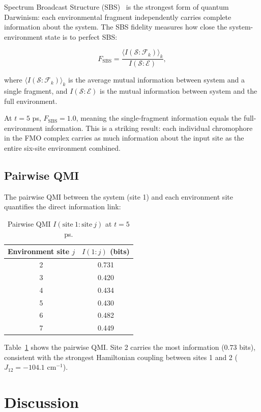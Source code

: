 \documentclass[aps,njp,twocolumn,showpacs,superscriptaddress]{revtex4-2}
\begin{document}
Spectrum Broadcast Structure (SBS)~\cite{Horodecki2015} is the strongest form of quantum Darwinism: each environmental fragment independently carries complete information about the system. The SBS fidelity measures how close the system-environment state is to perfect SBS:

\[
F_{\mathrm{SBS}} = \frac{\langle I(\mathcal{S} : \mathcal{F}_k) \rangle_k}{I(\mathcal{S} : \mathcal{E})},
\]

where $\langle I(\mathcal{S} : \mathcal{F}_k) \rangle_k$ is the average mutual information between system and a single fragment, and $I(\mathcal{S} : \mathcal{E})$ is the mutual information between system and the full environment.

At $t = 5$ ps, $F_{\mathrm{SBS}} = 1.0$, meaning the single-fragment information equals the full-environment information. This is a striking result: each individual chromophore in the FMO complex carries as much information about the input site as the entire six-site environment combined.

\subsection{Pairwise QMI}

The pairwise QMI between the system (site 1) and each environment site quantifies the direct information link:

\begin{table}[htbp]
\caption{Pairwise QMI $I(\mathrm{site\ 1} : \mathrm{site}\ j)$ at $t = 5$ ps.}
\label{tab:qmi}
\centering
\begin{tabular}{cc}
\toprule
Environment site $j$ & $I(1:j)$ (bits) \\
\midrule
2 & 0.731 \\
3 & 0.420 \\
4 & 0.434 \\
5 & 0.430 \\
6 & 0.482 \\
7 & 0.449 \\
\bottomrule
\end{tabular}
\end{table}

Table~\ref{tab:qmi} shows the pairwise QMI. Site 2 carries the most information ($0.73$ bits), consistent with the strongest Hamiltonian coupling between sites 1 and 2 ($J_{12} = -104.1$ cm$^{-1}$).

\section{Discussion}
\end{document}
